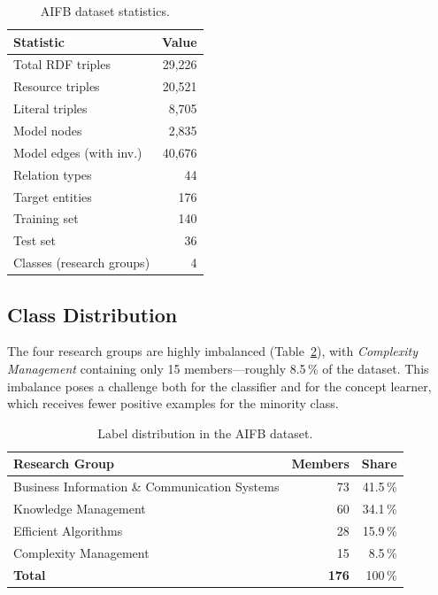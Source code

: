 \documentclass[runningheads]{llncs}
\begin{document}
\begin{table}[ht]
\centering
\caption{AIFB dataset statistics.}
\label{tab:dataset}
\begin{tabular}{lr}
\toprule
\textbf{Statistic} & \textbf{Value} \\
\midrule
Total RDF triples       & 29,226 \\
Resource triples        & 20,521 \\
Literal triples         & 8,705  \\
Model nodes             & 2,835  \\
Model edges (with inv.) & 40,676 \\
Relation types          & 44     \\
Target entities         & 176    \\
\quad Training set      & 140    \\
\quad Test set          & 36     \\
Classes (research groups) & 4    \\
\bottomrule
\end{tabular}
\end{table}

\subsection{Class Distribution}

The four research groups are highly imbalanced (Table~\ref{tab:labels}),
with \emph{Complexity Management} containing only 15 members---roughly 8.5\,\% of the dataset.
This imbalance poses a challenge both for the classifier and for the concept learner,
which receives fewer positive examples for the minority class.

\begin{table}[ht]
\centering
\caption{Label distribution in the AIFB dataset.}
\label{tab:labels}
\begin{tabular}{lrr}
\toprule
\textbf{Research Group} & \textbf{Members} & \textbf{Share} \\
\midrule
Business Information \& Communication Systems & 73 & 41.5\,\% \\
Knowledge Management                          & 60 & 34.1\,\% \\
Efficient Algorithms                          & 28 & 15.9\,\% \\
Complexity Management                         & 15 &  8.5\,\% \\
\midrule
\textbf{Total}                                & \textbf{176} & 100\,\% \\
\bottomrule
\end{tabular}
\end{table}
\end{document}
